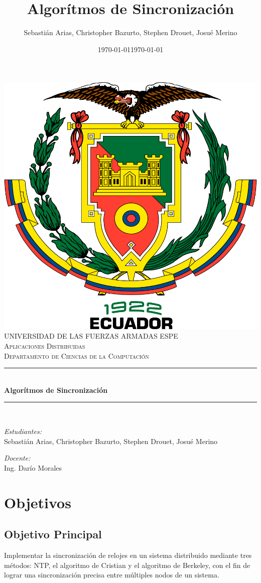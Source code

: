 \documentclass[a4paper,12pt]{report}
\title{Algorítmos de Sincronización}
\author{Sebastián Arias, Christopher Bazurto, Stephen Drouet, Josué Merino}
\date{\today}
\begin{document}
\begin{titlepage}
 \centering
    \includegraphics[width=0.5\linewidth]{images/ESPE2.png}\\[1.0 cm]
    \textsc{\Large UNIVERSIDAD DE LAS FUERZAS ARMADAS ESPE}\\[2 cm]
	\textsc{\Large Aplicaciones Distribuidas}\\[0.5 cm]
	\textsc{\large Departamento de Ciencias de la Computación}\\[0.5 cm]
	\rule{\linewidth}{0.2 mm} \\[0.4 cm]
	{ \huge \bfseries Algorítmos de Sincronización}\\
	\rule{\linewidth}{0.2 mm} \\[1.5 cm]
	
    \begin{flushleft} \large
        \emph{Estudiantes:}\\
        Sebastián Arias, Christopher Bazurto, Stephen Drouet, Josué Merino
    \end{flushleft}

    \begin{flushleft} \large
        \emph{Docente:}\\
        Ing. Darío Morales\\
    \end{flushleft}
    
    \vfill
    \date{\today}
    
\end{titlepage}

\tableofcontents
\listoffigures
\newpage
\chapter{Objetivos}

\section{Objetivo Principal}
Implementar la sincronización de relojes en un sistema distribuido mediante tres métodos: NTP, el algoritmo de Cristian y el algoritmo de Berkeley, con el fin de lograr una sincronización precisa entre múltiples nodos de un sistema. 
\end{document}
